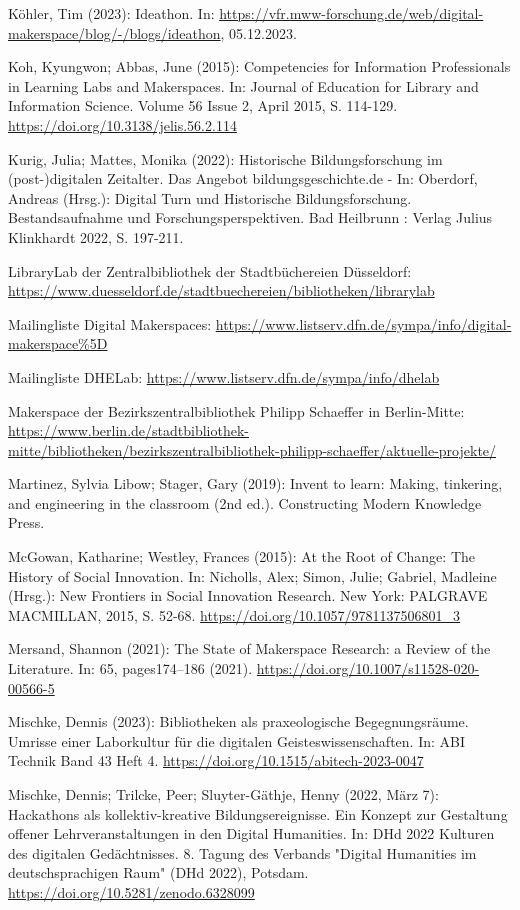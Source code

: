 \documentclass[a4paper,
fontsize=11pt,
oneside,
numbers=noperiodatend,
parskip=half-,
bibliography=totoc,
final
]{scrartcl}
\begin{document}
Köhler, Tim (2023): Ideathon. In:
\url{https://vfr.mww-forschung.de/web/digital-makerspace/blog/-/blogs/ideathon},
05.12.2023.

Koh, Kyungwon; Abbas, June (2015): Competencies for Information
Professionals in Learning Labs and Makerspaces. In: Journal of Education
for Library and Information Science. Volume 56 Issue 2, April 2015, S.
114-129. \url{https://doi.org/10.3138/jelis.56.2.114}

Kurig, Julia; Mattes, Monika (2022): Historische Bildungsforschung im
(post-)digitalen Zeitalter. Das Angebot bildungsgeschichte.de - In:
Oberdorf, Andreas (Hrsg.): Digital Turn und Historische
Bildungsforschung. Bestandsaufnahme und Forschungsperspektiven. Bad
Heilbrunn : Verlag Julius Klinkhardt 2022, S. 197-211.

LibraryLab der Zentralbibliothek der Stadtbüchereien Düsseldorf:
\url{https://www.duesseldorf.de/stadtbuechereien/bibliotheken/librarylab}

Mailingliste Digital Makerspaces:
\url{https://www.listserv.dfn.de/sympa/info/digital-makerspace\%5D}

Mailingliste DHELab: \url{https://www.listserv.dfn.de/sympa/info/dhelab}

Makerspace der Bezirkszentralbibliothek Philipp Schaeffer in
Berlin-Mitte:
\url{https://www.berlin.de/stadtbibliothek-mitte/bibliotheken/bezirkszentralbibliothek-philipp-schaeffer/aktuelle-projekte/}

Martinez, Sylvia Libow; Stager, Gary (2019): Invent to learn: Making,
tinkering, and engineering in the classroom (2nd ed.). Constructing
Modern Knowledge Press.

McGowan, Katharine; Westley, Frances (2015): At the Root of Change: The
History of Social Innovation. In: Nicholls, Alex; Simon, Julie; Gabriel,
Madleine (Hrsg.): New Frontiers in Social Innovation Research. New York:
PALGRAVE MACMILLAN, 2015, S. 52-68.
\url{https://doi.org/10.1057/9781137506801_3}

Mersand, Shannon (2021): The State of Makerspace Research: a Review of
the Literature. In: 65, pages174--186 (2021).
\url{https://doi.org/10.1007/s11528-020-00566-5}

Mischke, Dennis (2023): Bibliotheken als praxeologische Begegnungsräume.
Umrisse einer Laborkultur für die digitalen Geisteswissenschaften. In:
ABI Technik Band 43 Heft 4.
\url{https://doi.org/10.1515/abitech-2023-0047}

Mischke, Dennis; Trilcke, Peer; Sluyter-Gäthje, Henny (2022, März 7):
Hackathons als kollektiv-kreative Bildungsereignisse. Ein Konzept zur
Gestaltung offener Lehrveranstaltungen in den Digital Humanities. In:
DHd 2022 Kulturen des digitalen Gedächtnisses. 8. Tagung des Verbands
"Digital Humanities im deutschsprachigen Raum" (DHd 2022), Potsdam.
\url{https://doi.org/10.5281/zenodo.6328099}
\end{document}
